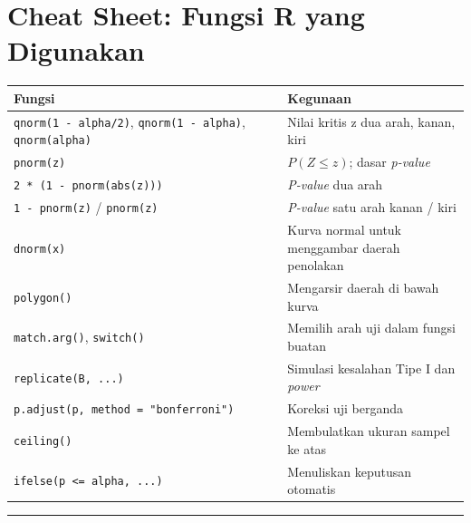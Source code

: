 \documentclass[
  indonesian,
  letterpaper,
]{book}
\newcounter{none} %
\begin{document}

\chapter{Cheat Sheet: Fungsi R yang
Digunakan}\label{cheat-sheet-fungsi-r-yang-digunakan-1}

{\def\LTcaptype{none} %
\begin{longtable}[]{@{}
  >{\raggedright\arraybackslash}p{}
  >{\raggedright\arraybackslash}p{}@{}}
\toprule\noalign{}
\begin{minipage}[b]{\linewidth}\raggedright
Fungsi
\end{minipage} & \begin{minipage}[b]{\linewidth}\raggedright
Kegunaan
\end{minipage} \\
\midrule\noalign{}
\endhead
\bottomrule\noalign{}
\endlastfoot
\texttt{qnorm(1\ -\ alpha/2)}, \texttt{qnorm(1\ -\ alpha)},
\texttt{qnorm(alpha)} & Nilai kritis z dua arah, kanan, kiri \\
\texttt{pnorm(z)} & \(P(Z \leq z)\); dasar \emph{p-value} \\
\texttt{2\ *\ (1\ -\ pnorm(abs(z)))} & \emph{P-value} dua arah \\
\texttt{1\ -\ pnorm(z)} / \texttt{pnorm(z)} & \emph{P-value} satu arah
kanan / kiri \\
\texttt{dnorm(x)} & Kurva normal untuk menggambar daerah penolakan \\
\texttt{polygon()} & Mengarsir daerah di bawah kurva \\
\texttt{match.arg()}, \texttt{switch()} & Memilih arah uji dalam fungsi
buatan \\
\texttt{replicate(B,\ ...)} & Simulasi kesalahan Tipe I dan
\emph{power} \\
\texttt{p.adjust(p,\ method\ =\ "bonferroni")} & Koreksi uji berganda \\
\texttt{ceiling()} & Membulatkan ukuran sampel ke atas \\
\texttt{ifelse(p\ \textless{}=\ alpha,\ ...)} & Menuliskan keputusan
otomatis \\
\end{longtable}
}

\begin{center}\rule{0.5\linewidth}{0.5pt}\end{center}
\end{document}
